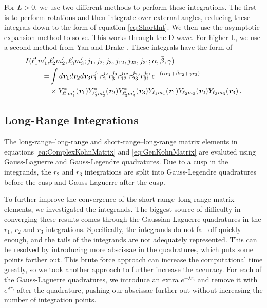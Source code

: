 \documentclass[preprint,showpacs,preprintnumbers,amsmath,amssymb]{revtex4}
\begin{document}
For $L > 0$, we use two different methods to perform these integrations. The first is to perform rotations and then integrate over external angles, reducing these integrals down to the form of equation \ref{eq:ShortInt}. We then use the asymptotic expansion method to solve. This works through the D-wave. For higher L, we use a second method from Yan and Drake \cite{Yan1997}. These integrals have the form of
\begin{align}
\label{eq:ShortIntGen}
\nonumber I(\ell_1^\prime m_1^\prime, & \ell_2^\prime m_2^\prime, \ell_3^\prime m_3^\prime; j_1,j_2,j_3,j_{12},j_{23},j_{31}; \bar{\alpha}, \bar{\beta}, \bar{\gamma}) \\
\nonumber = & \int
d \textit{\textbf{r}}_1 d \textit{\textbf{r}}_2 d \textit{\textbf{r}}_3
r_1^{j_1} r_2^{j_2} r_3^{j_3} r_{12}^{j_{12}}
r_{23}^{j_{23}} r_{31}^{j_{31}}
e^{-(\bar{\alpha} r_1 + \bar{\beta} r_2 + \bar{\gamma} r_3)} \\
& \times Y_{\ell_1^\prime m_1^\prime}^* (\textit{\textbf{r}}_1) Y_{\ell_2^\prime m_2^\prime}^* (\textit{\textbf{r}}_2) Y_{\ell_3^\prime m_3^\prime}^* (\textit{\textbf{r}}_3)
Y_{\ell_1 m_1} (\textit{\textbf{r}}_1) Y_{\ell_2 m_2} (\textit{\textbf{r}}_2) Y_{\ell_3 m_3} (\textit{\textbf{r}}_3)\, .
\end{align}

\subsection{Long-Range Integrations}
\label{sec:LongInt}
The long-range--long-range and short-range--long-range matrix elements in equations \ref{eq:ComplexKohnMatrix} and \ref{eq:GenKohnMatrix} are evaluted using Gauss-Laguerre and Gauss-Legendre quadratures. Due to a cusp in the integrands, the $r_2$ and $r_3$ integrations are split into Gauss-Legendre quadratures before the cusp and Gauss-Laguerre after the cusp. 

To further improve the convergence of the short-range--long-range matrix elements, we investigated the integrands. The biggest source of difficulty in converging these results comes through the Gaussian-Laguerre quadratures in the $r_1$, $r_2$ and $r_3$ integrations. Specifically, the integrands do not fall off quickly enough, and the tails of the integrands are not adequately represented. This can be resolved by introducing more abscissae in the quadratures, which puts some points farther out. This brute force approach can increase the computational time greatly, so we took another approach to further increase the accuracy. For each of the Gauss-Laguerre quadratures, we introduce an extra $e^{-\lambda r_i}$ and remove it with $e^{\lambda r_i}$ after the quadrature, pushing our abscissae further out without increasing the number of integration points.
\end{document}
